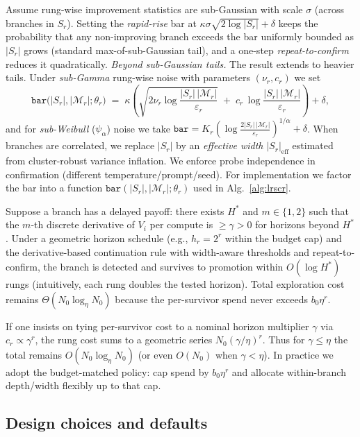 \documentclass{article}
\begin{document}
Assume rung-wise improvement statistics are sub-Gaussian with scale $\sigma$ (across branches in $S_r$).
Setting the \emph{rapid-rise} bar at $\kappa\sigma\sqrt{2\log|S_r|}+\delta$ keeps the probability that any non-improving branch exceeds the bar uniformly bounded as $|S_r|$ grows (standard max-of-sub-Gaussian tail), and a one-step \emph{repeat-to-confirm} reduces it quadratically.
\emph{Beyond sub-Gaussian tails.} The result extends to heavier tails.
Under \emph{sub-Gamma} rung-wise noise with parameters $(\nu_r,c_r)$ we set
\begin{equation}
\texttt{bar}\big(|S_r|,|\mathcal{M}_r|;\theta_r\big)\;=\;\kappa\!\left(\sqrt{2\nu_r\log\frac{|S_r|\,|\mathcal{M}_r|}{\varepsilon_r}}\;+\;c_r\,\log\frac{|S_r|\,|\mathcal{M}_r|}{\varepsilon_r}\right)+\delta,
\end{equation}
and for \emph{sub-Weibull} ($\psi_\alpha$) noise we take
$\texttt{bar}=K_r\!\left(\log\frac{2|S_r|\,|\mathcal{M}_r|}{\varepsilon_r}\right)^{1/\alpha}+\delta$.
When branches are correlated, we replace $|S_r|$ by an \emph{effective width} $|S_r|_{\mathrm{eff}}$ estimated from cluster-robust variance inflation.
We enforce probe independence in confirmation (different temperature/prompt/seed).
For implementation we factor the bar into a function $\texttt{bar}(|S_r|,|\mathcal{M}_r|;\theta_r)$ used in Alg.~\ref{alg:lrscr}.

Suppose a branch has a delayed payoff: there exists $H^{*}$ and $m\!\in\!\{1,2\}$ such that the $m$-th discrete derivative of $V_i$ per compute is $\ge \gamma>0$ for horizons beyond $H^{*}$.
Under a geometric horizon schedule (e.g., $h_r=2^r$ within the budget cap) and the derivative-based continuation rule with width-aware thresholds and repeat-to-confirm, the branch is detected and survives to promotion within $O(\log H^{*})$ rungs (intuitively, each rung doubles the tested horizon).
Total exploration cost remains $\Theta(N_0 \log_\eta N_0)$ because the per-survivor spend never exceeds $b_0\eta^r$.

If one insists on tying per-survivor cost to a nominal horizon multiplier $\gamma$ via $c_r\propto \gamma^r$, the rung cost sums to a geometric series $N_0(\gamma/\eta)^r$.
Thus for $\gamma\le\eta$ the total remains $O(N_0\log_\eta N_0)$ (or even $O(N_0)$ when $\gamma<\eta$).
In practice we adopt the budget-matched policy: cap spend by $b_0\eta^r$ and allocate within-branch depth/width flexibly up to that cap.

\vspace{0.5em}
\subsection{Design choices and defaults}
\label{sec:defaults}
\end{document}
